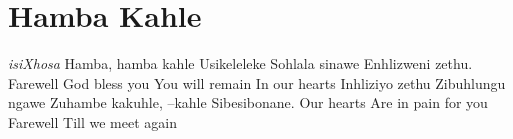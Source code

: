\starttocol
\chapter{Hamba Kahle}
\nexttocol
\hfill{\it isiXhosa}
\stoptocol
\starttocol
\startlines
H{\sc amba}, hamba kahle
Usikeleleke
Sohlala sinawe
Enhlizweni zethu.
\stoplines
\nexttocol
\startlines
Farewell
God bless you
You will remain
In our hearts
\stoplines
\stoptocol
\starttocol
\startlines
Inhliziyo zethu
Zibuhlungu ngawe
Zuhambe kakuhle, --kahle
Sibesibonane.
\stoplines
\nexttocol
\startlines
Our hearts
Are in pain for you
Farewell
Till we meet again
\stoplines
\stoptocol

